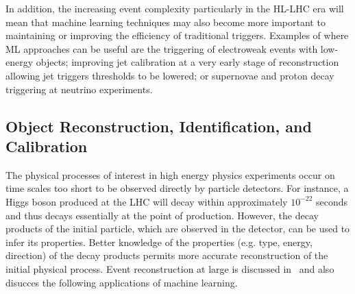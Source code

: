In addition, the increasing event complexity particularly in the HL-LHC era will mean that machine learning techniques may also become more important to maintaining or improving the efficiency of traditional triggers. Examples of where ML approaches can be useful are the triggering of electroweak events with low-energy objects; improving jet calibration at a very early stage of reconstruction allowing jet triggers thresholds to be lowered; or supernovae and proton decay triggering at neutrino experiments.



\subsection{Object Reconstruction, Identification, and Calibration}
\label{sec:object-reco-id-calib}


The physical processes of interest in high energy physics experiments occur on time scales too short to be observed directly by particle detectors. For instance, a Higgs boson produced at the LHC will decay within approximately $10^{-22}$ seconds and thus decays essentially at the point of production. However, the decay products of the initial particle, which are observed in the detector, can be used to infer its properties. Better knowledge of the properties (e.g. type, energy, direction) of the decay products permits more accurate reconstruction of the initial physical process. Event reconstruction at large is discussed in~\cite{recoCWP} and also disucces the following applications of machine learning.\\

